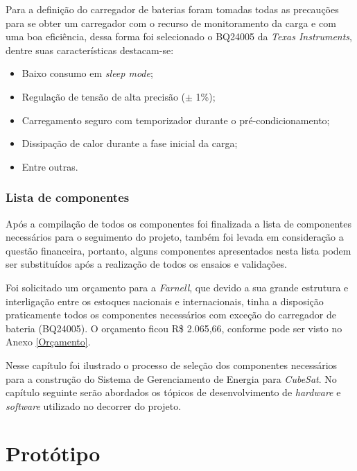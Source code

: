 \documentclass[
	12pt,				%
	openright,			%
	oneside,			%
	a4paper,			%
	english,			%
	french,				%
	spanish,			%
	brazil,				%
	oldfontcommands
	]{abntex2}
\begin{document}
	Para a definição do carregador de baterias foram tomadas todas as precauções para se obter um carregador com o recurso de monitoramento da carga e com uma boa eficiência, dessa forma foi selecionado o BQ24005 da \textit{Texas Instruments}, dentre suas características destacam-se:
	
	\begin{itemize}
		\item Baixo consumo em \textit{sleep mode};
		\item Regulação de tensão de alta precisão ($\pm$ 1\%);
		\item Carregamento seguro com temporizador durante o pré-condicionamento;
		\item Dissipação de calor durante a fase inicial da carga;
		\item Entre outras.
	\end{itemize}
	
\subsection[Lista de componentes]{Lista de componentes}

	Após a compilação de todos os componentes foi finalizada a lista de componentes necessários para o seguimento do projeto, também foi levada em consideração a questão financeira, portanto, alguns componentes apresentados nesta lista podem ser substituídos após a realização de todos os ensaios e validações.
		
	Foi solicitado um orçamento para a \textit{Farnell}, que devido a sua grande estrutura e interligação entre os estoques nacionais e internacionais, tinha a disposição praticamente todos os componentes necessários com exceção do carregador de bateria (BQ24005). O orçamento ficou R\$ 2.065,66, conforme pode ser visto no Anexo \ref{Orçamento}.	
	
	Nesse capítulo foi ilustrado o processo de seleção dos componentes necessários para a construção do Sistema de Gerenciamento de Energia para \textit{CubeSat}. No capítulo seguinte serão abordados os tópicos de desenvolvimento de \textit{hardware} e \textit{software} utilizado no decorrer do projeto.
	
\chapter[Protótipo]{Protótipo}
\end{document}
